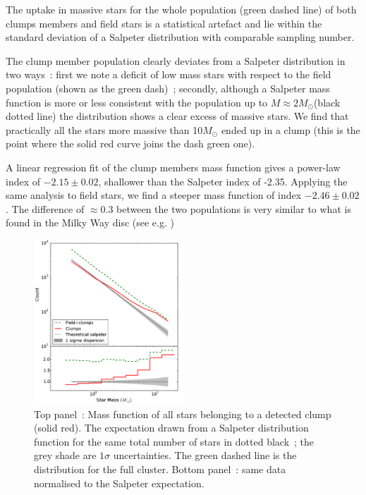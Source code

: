 The uptake  in massive stars for the whole population (green dashed line) of both clumps members and field stars is a statistical artefact and lie within the standard deviation of a Salpeter distribution with comparable sampling number. 

The clump member population clearly deviates from a Salpeter distribution in two ways~: first we note a deficit of low mass stars with respect to the field population (shown as the green dash)~; secondly, although a Salpeter mass function is more or less consistent with the population up to $M\approx 2M_\odot$(black dotted line) the distribution shows a clear excess of massive stars. We find that practically all the stars more massive than 10$M_\odot$ ended up in a clump (this is the point where the solid red curve joins the dash green one). 

A linear regression fit of the clump members mass function gives a power-law index of $-2.15 \pm 0.02$, shallower than the Salpeter index of -2.35. Applying the same analysis to field stars,  we find a steeper mass function of index $-2.46 \pm 0.02$. The difference of $\approx 0.3 $ between the two populations is very similar to what is found in the Milky Way disc (see e.g. \citealt{Czekaj2014,Rybizki2015,Bastian2010} )

\begin{figure}
\begin{center}
\includegraphics[width=0.5\textwidth]{Figures/2_ClumpMembers}
\caption{Top panel~: Mass function of all stars belonging to a detected clump (solid red). The expectation drawn from a Salpeter distribution function for the same total number of stars in dotted black~; the grey shade are $1\sigma$ uncertainties. The green dashed line is the  distribution for the full cluster. Bottom panel~:  same data normalised to the Salpeter expectation.}
\label{Fig:2_ClumpMembers}
\end{center}
\end{figure}

